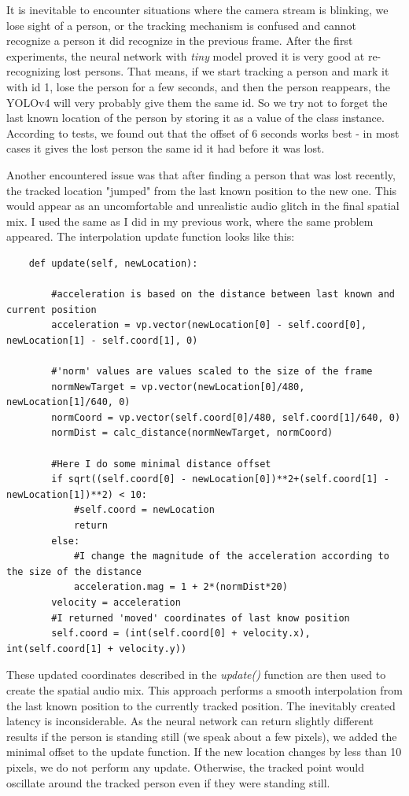 \documentclass{ctuthesis}
\begin{document}
It is inevitable to encounter situations where the camera stream is blinking, we lose sight of a person, or the tracking mechanism is confused and cannot recognize a person it did recognize in the previous frame. After the first experiments, the neural network with \textit{tiny} model proved it is very good at re-recognizing lost persons. That means, if we start tracking a person and mark it with id 1, lose the person for a few seconds, and then the person reappears, the YOLOv4 will very probably give them the same id. So we try not to forget the last known location of the person by storing it as a value of the class instance. According to tests, we found out that the offset of 6 seconds works best - in most cases it gives the lost person the same id it had before it was lost. 

Another encountered issue was that after finding a person that was lost recently, the tracked location "jumped" from the last known position to the new one. This would appear as an uncomfortable and unrealistic audio glitch in the final spatial mix. I used the same as I did in my previous work, where the same problem appeared. The interpolation update function looks like this:


\begin{lstlisting}
    def update(self, newLocation):
    
        #acceleration is based on the distance between last known and current position
        acceleration = vp.vector(newLocation[0] - self.coord[0], newLocation[1] - self.coord[1], 0)
        
        #'norm' values are values scaled to the size of the frame
        normNewTarget = vp.vector(newLocation[0]/480, newLocation[1]/640, 0)
        normCoord = vp.vector(self.coord[0]/480, self.coord[1]/640, 0)
        normDist = calc_distance(normNewTarget, normCoord)
        
        #Here I do some minimal distance offset
        if sqrt((self.coord[0] - newLocation[0])**2+(self.coord[1] - newLocation[1])**2) < 10:
            #self.coord = newLocation
            return
        else:
            #I change the magnitude of the acceleration according to the size of the distance
            acceleration.mag = 1 + 2*(normDist*20)
        velocity = acceleration
        #I returned 'moved' coordinates of last know position
        self.coord = (int(self.coord[0] + velocity.x), int(self.coord[1] + velocity.y))
\end{lstlisting}
\label{interpolation}
These updated coordinates described in the \textit{update()} function are then used to create the spatial audio mix. This approach performs a smooth interpolation from the last known position to the currently tracked position. The inevitably created latency is inconsiderable. As the neural network can return slightly different results if the person is standing still (we speak about a few pixels), we added the minimal offset to the update function. If the new location changes by less than 10 pixels, we do not perform any update. Otherwise, the tracked point would oscillate around the tracked person even if they were standing still.
\end{document}
